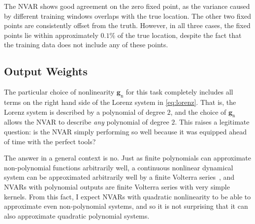 The NVAR shows good agreement on the zero fixed point, as the variance
caused by different training windows overlaps with the true
location. The other two fixed points are consistently offset from the
truth. However, in all three cases, the fixed points lie within
approximately $0.1\%$ of the true location, despite the fact that the
training data does not include any of these points.

\subsection{Output Weights}

The particular choice of nonlinearity $\bm{g}_\text{n}$ for this task
completely includes all terms on the right hand side of the Lorenz
system in \cref{eq:lorenz}. That is, the Lorenz system is described by
a polynomial of degree $2$, and the choice of $\bm{g}_\text{n}$ allows
the NVAR to describe \emph{any} polynomial of degree $2$. This raises
a legitimate question: is the NVAR simply performing so well because
it was equipped ahead of time with the perfect tools?

The answer in a general context is no. Just as finite polynomials can
approximate non-polynomial functions arbitrarily well, a continuous
nonlinear dynamical system can be approximated arbitrarily well by a
finite Volterra series~\cite{franz2006}, and NVARs with polynomial
outputs are finite Volterra series with very simple kernels. From this
fact, I expect NVARs with quadratic nonlinearity to be able to
approximate even non-polynomial systems, and so it is not surprising
that it can also approximate quadratic polynomial systems.

